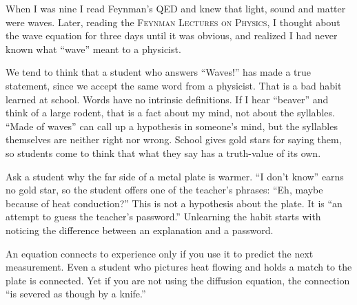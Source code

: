 
When I was nine I read Feynman's \textsc{QED} and knew that light, sound and matter were waves.  Later, reading the \textsc{Feynman Lectures on Physics}, I thought about the wave equation for three days until it was obvious, and realized I had never known what ``wave'' meant to a physicist.

We tend to think that a student who answers ``Waves!'' has made a true statement, since we accept the same word from a physicist. That is a bad habit learned at school. Words have no intrinsic definitions. If I hear ``beaver'' and think of a large rodent, that is a fact about my mind, not about the syllables. ``Made of waves'' can call up a hypothesis in someone's mind, but the syllables themselves are neither right nor wrong. School gives gold stars for saying them, so students come to think that what they say has a truth-value of its own. 

Ask a student why the far side of a metal plate is warmer. ``I don't know'' earns no gold star, so the student offers one of the teacher's phrases: ``Eh, maybe because of heat conduction?'' This is not a hypothesis about the plate. It is ``an attempt to guess the teacher's password.'' Unlearning the habit starts with noticing the difference between an explanation and a password. 

An equation connects to experience only if you use it to predict the next measurement. Even a student who pictures heat flowing and holds a match to the plate is connected. Yet if you are not using the diffusion equation, the connection ``is severed as though by a knife.'' 


